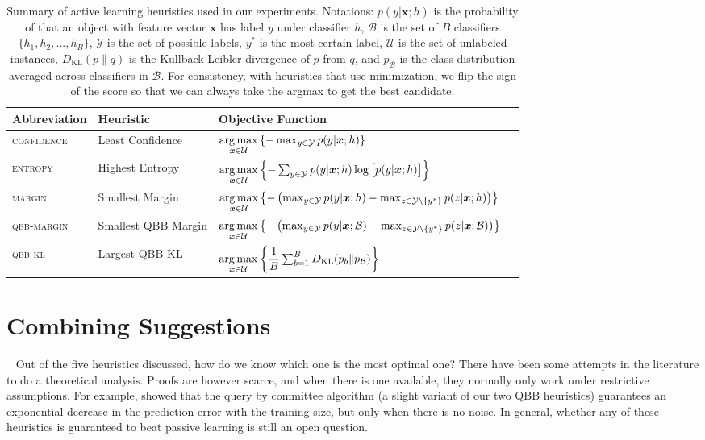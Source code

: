 \documentclass[fleqn,10pt,lineno]{wlpeerj} %
\newcommand{\B}{\mathcal{B}}
\newcommand{\Y}{\mathcal{Y}}
\newcommand{\Unlabeled}{\mathcal{U}}
\newcommand*{\argmax}{\operatornamewithlimits{arg\,max}\limits}
\begin{document}
\begin{table}[t]
	\caption {Summary of active learning heuristics used in our experiments.
			  Notations: $p(y | \bm{x}; h)$ is the probability of that an
			  object with feature vector $\bm{x}$ has label $y$ under
			  classifier $h$, $\B$ is the set of $B$ classifiers $\{h_1, h_2,
			  ..., h_B\}$, $\Y$ is the set of possible labels, $y^*$ is the
			  most certain label, $\Unlabeled$ is the set of unlabeled
			  instances, $D_{\mathrm{KL}}(p\|q)$ is the Kullback-Leibler
			  divergence of $p$ from $q$, and $p_\B$ is the class distribution
			  averaged across classifiers in $\B$. For consistency, with
			  heuristics that use minimization, we flip the sign of the score
			  so that we can always take the argmax to get the best candidate.}
	\label{tab:heuristics}
	\centering
	\begin{tabular}{llll}
		\toprule
		Abbreviation & {Heuristic}  &  Objective Function  \\
		\midrule
        \textsc{confidence} & Least Confidence &
			$\argmax_{\bm{x} \in \Unlabeled}
			\left\{ - \max_{y \in \Y} p(y | \bm{x}; h) \right\}$ \\
		\textsc{entropy} & Highest Entropy &
			$\argmax_{\bm{x} \in \Unlabeled} \left\{-\sum_{y \in \Y} p(y | \bm{x}; h)
            \log \big[ p(y | \bm{x}; h) \big] \right\}$
			\\[2ex]
		\textsc{margin} & Smallest Margin &
			$\argmax_{\bm{x} \in \Unlabeled} \left\{ - \left( \max_{y \in \Y} p(y | \bm{x}; h) -
            \max_{z \in \Y \setminus \{y^*\}} p(z | \bm{x}; h) \right) \right\}$
			\\[2ex]
		\textsc{qbb-margin} & Smallest QBB Margin &
			$\argmax_{\bm{x} \in \Unlabeled} \left\{ - \left( \max_{y \in \Y} p(y | \bm{x}; \B) -
            \max_{z \in \Y \setminus \{y^*\}} p(z | \bm{x}; \B) \right) \right\}$
			\\[2ex]
		\textsc{qbb-kl} & Largest QBB KL &
			$\argmax_{\bm{x} \in \Unlabeled} \left\{ \dfrac{1}{B}
               \sum_{b=1}^B D_{\mathrm{KL}}(p_b\|p_\B) \right\}$
			\\
		\bottomrule
	\end{tabular}
\end{table}

\section{Combining Suggestions}~\label{sec:expert}
Out of the five heuristics discussed, how do we know which one is the most
optimal one? There have been some attempts in the literature to do a
theoretical analysis. Proofs are however scarce, and when there is one
available, they normally only work under restrictive assumptions. For example,
\cite{freund97} showed that the query by committee algorithm (a slight variant
of our two QBB heuristics) guarantees an exponential decrease in the prediction
error with the training size, but only when there is no noise. In general,
whether any of these heuristics is guaranteed to beat passive learning is still
an open question.
\end{document}
